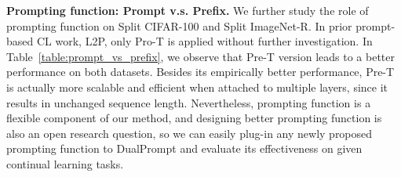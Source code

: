 \documentclass[runningheads]{llncs}
\newcommand{\zizhaoz}[1]{\textcolor{green}{Zizhao: #1}}
\newcommand{\method}{DualPrompt\xspace}
\newcommand{\gprompt}{G-Prompt\xspace}
\newcommand{\eprompt}{E-Prompt\xspace}
\begin{document}
\noindent
\textbf{Prompting function: Prompt v.s. Prefix.}
We further study the role of prompting function on Split CIFAR-100 and Split ImageNet-R. In prior prompt-based CL work, L2P, only Pro-T is applied without further investigation. In Table~\ref{table:prompt_vs_prefix}, we observe that Pre-T version leads to a better performance on both datasets. 
Besides its empirically better performance, Pre-T is actually more scalable and efficient when attached to multiple layers, since it results in unchanged sequence length. Nevertheless, prompting function is a flexible component of our method, and designing better prompting function is also an open research question, so we can easily plug-in any newly proposed prompting function to \method and evaluate its effectiveness on given continual learning tasks. 
\end{document}
